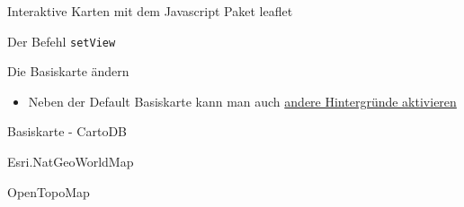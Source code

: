 \documentclass[ignorenonframetext,]{beamer}
\newenvironment{Shaded}{}{}
\newcommand{\KeywordTok}[1]{\textcolor[rgb]{0.00,0.44,0.13}{\textbf{{#1}}}}
\newcommand{\DataTypeTok}[1]{\textcolor[rgb]{0.56,0.13,0.00}{{#1}}}
\newcommand{\DecValTok}[1]{\textcolor[rgb]{0.25,0.63,0.44}{{#1}}}
\newcommand{\FloatTok}[1]{\textcolor[rgb]{0.25,0.63,0.44}{{#1}}}
\newcommand{\StringTok}[1]{\textcolor[rgb]{0.25,0.44,0.63}{{#1}}}
\newcommand{\NormalTok}[1]{{#1}}
\providecommand{\tightlist}{%
\setlength{\itemsep}{0pt}\setlength{\parskip}{0pt}}
\begin{document}
\begin{frame}[fragile]{Interaktive Karten mit dem Javascript Paket
leaflet}
\begin{block}{Der Befehl \texttt{setView}}
\end{block}

\begin{block}{Die Basiskarte ändern}

\begin{itemize}
\tightlist
\item
  Neben der Default Basiskarte kann man auch
  \href{http://leaflet-extras.github.io/leaflet-providers/preview/index.html}{andere
  Hintergründe aktivieren}
\end{itemize}

\begin{Shaded}
\end{Shaded}

\end{block}

\begin{block}{Basiskarte - CartoDB}

\begin{Shaded}
\end{Shaded}

\end{block}

\begin{block}{Esri.NatGeoWorldMap}

\begin{Shaded}
\end{Shaded}

\end{block}

\begin{block}{OpenTopoMap}


\end{block}
\end{frame}
\end{document}
